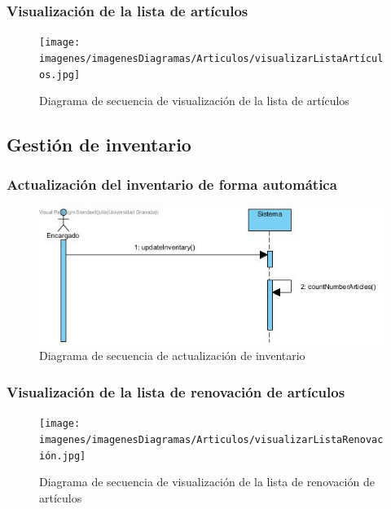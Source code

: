 \subsubsection{Visualización de la lista de artículos}

\begin{figure}[H]
	\centering
	\texttt{[image: imagenes/imagenesDiagramas/Articulos/visualizarListaArtículos.jpg]}
	\caption{Diagrama de secuencia de visualización de la lista de artículos}
	\label{fig:seqdiag9}
\end{figure}

\subsection{Gestión de inventario}

\subsubsection{Actualización del inventario de forma automática}

\begin{figure}[H]
	\centering
	\includegraphics[width=1\textwidth]{imagenes/imagenesDiagramas/Articulos/actualizarInventario.jpg}
	\caption{Diagrama de secuencia de actualización de inventario}
	\label{fig:seqdiag10}
\end{figure}

\subsubsection{Visualización de la lista de renovación de artículos}

\begin{figure}[H]
	\centering
	\texttt{[image: imagenes/imagenesDiagramas/Articulos/visualizarListaRenovación.jpg]}
	\caption{Diagrama de secuencia de visualización de la lista de renovación de artículos}
	\label{fig:seqdiag11}
\end{figure}

